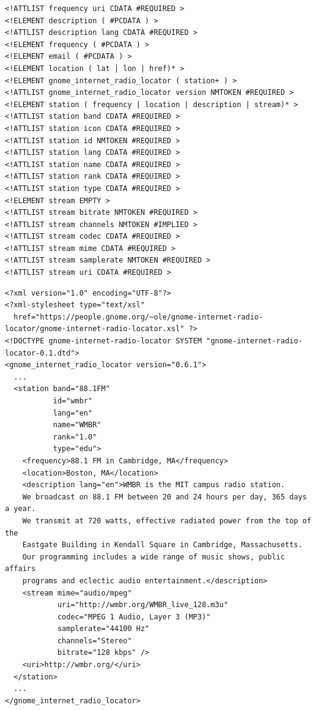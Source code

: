 \documentclass[20pt,landscape]{foils}
\begin{document}

\begin{tiny}
\begin{verbatim}
<!ATTLIST frequency uri CDATA #REQUIRED >
<!ELEMENT description ( #PCDATA ) >
<!ATTLIST description lang CDATA #REQUIRED >
<!ELEMENT frequency ( #PCDATA ) >
<!ELEMENT email ( #PCDATA ) >
<!ELEMENT location ( lat | lon | href)* >
<!ELEMENT gnome_internet_radio_locator ( station+ ) >
<!ATTLIST gnome_internet_radio_locator version NMTOKEN #REQUIRED >
<!ELEMENT station ( frequency | location | description | stream)* >
<!ATTLIST station band CDATA #REQUIRED >
<!ATTLIST station icon CDATA #REQUIRED >
<!ATTLIST station id NMTOKEN #REQUIRED >
<!ATTLIST station lang CDATA #REQUIRED >
<!ATTLIST station name CDATA #REQUIRED >
<!ATTLIST station rank CDATA #REQUIRED >
<!ATTLIST station type CDATA #REQUIRED >
<!ELEMENT stream EMPTY >
<!ATTLIST stream bitrate NMTOKEN #REQUIRED >
<!ATTLIST stream channels NMTOKEN #IMPLIED >
<!ATTLIST stream codec CDATA #REQUIRED >
<!ATTLIST stream mime CDATA #REQUIRED >
<!ATTLIST stream samplerate NMTOKEN #REQUIRED >
<!ATTLIST stream uri CDATA #REQUIRED >
\end{verbatim}
\end{tiny}


\begin{tiny}
\begin{verbatim}
<?xml version="1.0" encoding="UTF-8"?>
<?xml-stylesheet type="text/xsl"
  href="https://people.gnome.org/~ole/gnome-internet-radio-locator/gnome-internet-radio-locator.xsl" ?>
<!DOCTYPE gnome-internet-radio-locator SYSTEM "gnome-internet-radio-locator-0.1.dtd">
<gnome_internet_radio_locator version="0.6.1">
  ...
  <station band="88.1FM"
           id="wmbr"
           lang="en"
           name="WMBR"
           rank="1.0"
           type="edu">
    <frequency>88.1 FM in Cambridge, MA</frequency>
    <location>Boston, MA</location>
    <description lang="en">WMBR is the MIT campus radio station.
    We broadcast on 88.1 FM between 20 and 24 hours per day, 365 days a year.
    We transmit at 720 watts, effective radiated power from the top of the
    Eastgate Building in Kendall Square in Cambridge, Massachusetts.
    Our programming includes a wide range of music shows, public affairs
    programs and eclectic audio entertainment.</description>
    <stream mime="audio/mpeg"
            uri="http://wmbr.org/WMBR_live_128.m3u"
            codec="MPEG 1 Audio, Layer 3 (MP3)"
            samplerate="44100 Hz"
            channels="Stereo"
            bitrate="128 kbps" />
    <uri>http://wmbr.org/</uri>
  </station>
  ...
</gnome_internet_radio_locator>
\end{verbatim}
\end{tiny}
\end{document}

